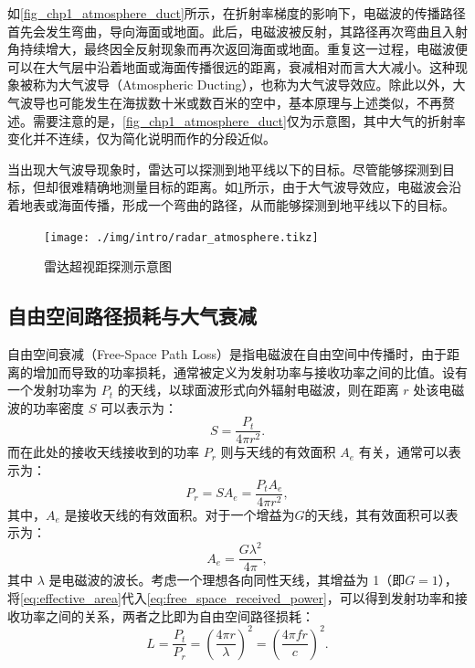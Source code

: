 如\cref{fig_chp1_atmosphere_duct}所示，在折射率梯度的影响下，电磁波的传播路径首先会发生弯曲，导向海面或地面。此后，电磁波被反射，其路径再次弯曲且入射角持续增大，最终因全反射现象而再次返回海面或地面。重复这一过程，电磁波便可以在大气层中沿着地面或海面传播很远的距离，衰减相对而言大大减小。这种现象被称为大气波导（Atmospheric Ducting），也称为大气波导效应。除此以外，大气波导也可能发生在海拔数十米或数百米的空中，基本原理与上述类似，不再赘述。需要注意的是，\cref{fig_chp1_atmosphere_duct}仅为示意图，其中大气的折射率变化并不连续，仅为简化说明而作的分段近似。

当出现大气波导现象时，雷达可以探测到地平线以下的目标。尽管能够探测到目标，但却很难精确地测量目标的距离。如\cref{fig_chp1_radar_ducting}所示，由于大气波导效应，电磁波会沿着地表或海面传播，形成一个弯曲的路径，从而能够探测到地平线以下的目标。
\begin{figure}[htb!]
    \centering
    \texttt{[image: ./img/intro/radar\_atmosphere.tikz]}
    \caption{雷达超视距探测示意图}
    \label{fig_chp1_radar_ducting}
\end{figure}

\subsection{自由空间路径损耗与大气衰减}

自由空间衰减（Free-Space Path Loss）是指电磁波在自由空间中传播时，由于距离的增加而导致的功率损耗，通常被定义为发射功率与接收功率之间的比值。设有一个发射功率为 $P_t$ 的天线，以球面波形式向外辐射电磁波，则在距离 $r$ 处该电磁波的功率密度 $S$ 可以表示为：
\begin{equation*}
    S = \frac{P_t}{4 \pi r^2}.
    \label{eq:free_space_power_density}
\end{equation*}
而在此处的接收天线接收到的功率 $P_r$ 则与天线的有效面积 $A_e$ 有关，通常可以表示为：
\begin{equation}
    P_r = S A_e = \frac{P_t A_e}{4 \pi r^2},
    \label{eq:free_space_received_power}
\end{equation}
其中，$A_e$ 是接收天线的有效面积。对于一个增益为\( G \)的天线，其有效面积可以表示为：
\begin{equation}
    A_e = \frac{G \lambda^2}{4 \pi},
    \label{eq:effective_area}
\end{equation}
其中 $\lambda$ 是电磁波的波长。考虑一个理想各向同性天线，其增益为 1（即$G=1$），将\cref{eq:effective_area}代入\cref{eq:free_space_received_power}，可以得到发射功率和接收功率之间的关系，两者之比即为自由空间路径损耗：
\begin{equation}
    L = \frac{P_t}{P_r} = \left( \frac{4 \pi r}{\lambda} \right)^2 = \left( \frac{4 \pi f r}{c} \right)^2.
    \label{eq:free_space_received_power_final}
\end{equation}

